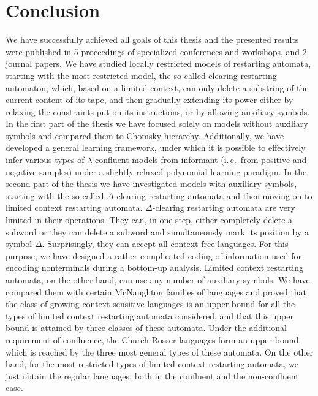 \chapter*{Conclusion}\label{chapter:conclusion}

We have successfully achieved all goals of this thesis and the presented results were published in 5 proceedings of specialized conferences and workshops, and 2 journal papers. We have studied locally restricted models of restarting automata, starting with the most restricted model, the so-called clearing restarting automaton, which, based on a limited context, can only delete a substring of the current content of its tape, and then gradually extending its power either by relaxing the constraints put on its instructions, or by allowing auxiliary symbols. In the first part of the thesis we have focused solely on models without auxiliary symbols and compared them to Chomsky hierarchy. Additionally, we have developed a general learning framework, under which it is possible to effectively infer various types of $\lambda$-confluent models from informant (i.\,e.\ from positive and negative samples) under a slightly relaxed polynomial learning paradigm. In the second part of the thesis we have investigated models with auxiliary symbols, starting with the so-called $\Delta$-clearing restarting automata and then moving on to limited context restarting automata. $\Delta$-clearing restarting automata are very limited in their operations. They can, in one step, either completely delete a subword or they can delete a subword and simultaneously mark its position by a symbol $\Delta$. Surprisingly, they can accept all context-free languages. For this purpose, we have designed a rather complicated coding of information used for encoding nonterminals during a bottom-up analysis. Limited context restarting automata, on the other hand, can use any number of auxiliary symbols. We have compared them with certain McNaughton families of languages and proved that the class of growing context-sensitive languages is an upper bound for all the types of limited context restarting automata considered, and that this upper bound is attained by three classes of these automata. Under the additional requirement of confluence, the Church-Rosser languages form an upper bound, which is reached by the three most general types of these automata. On the other hand, for the most restricted types of limited context restarting automata, we just obtain the regular languages, both in the confluent and the non-confluent case.

